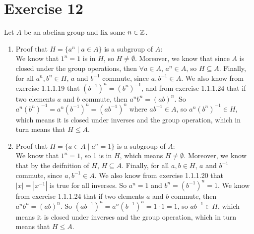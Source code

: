 \documentclass[12pt]{article}
\begin{document}
    \section*{Exercise 12}
    Let $A$ be an abelian group and fix some $n \in \mathbb{Z}$. \\
    \begin{enumerate}[label=\textbf{\alph*.}]
        \item 
            Proof that $H = \{a^n \mid a \in A\}$ is a subgroup of $A$: \\
            We know that $1^n = 1$ is in $H$, so $H \neq \emptyset$.
            Moreover, we know that since $A$ is closed under
            the group operations,
            then $\forall a \in A$, $a^n \in A$,
            so $H \subseteq A$.
            Finally, for all $a^n, b^n \in H$, $a$ and $b^{-1}$ commute,
            since $a, b^{-1} \in A$.
            We also know from exercise 1.1.1.19
            that $(b^{-1})^n = (b^n)^{-1}$,
            and from exercise 1.1.1.24 that if two elements $a$ and $b$
            commute, then $a^nb^n = (ab)^n$.
            So $a^n(b^n)^{-1} = a^n(b^{-1})^n = (ab^{-1})^n$
            where $ab^{-1} \in A$,
            so $a^n(b^n)^{-1} \in H$,
            which means it is closed under inverses and the group operation,
            which in turn means that $H \leqslant A$.
        \item
            Proof that $H = \{a \in A \mid a^n = 1\}$ is a subgroup of $A$: \\
            We know that $1^n = 1$, so 1 is in $H$,
            which means $H \neq \emptyset$.
            Moreover, we know that by the deifnition of $H$,
            $H \subseteq A$.
            Finally, for all $a, b \in H$, $a$ and $b^{-1}$ commute,
            since $a, b^{-1} \in A$.
            We also know from exercise 1.1.1.20 that $|x| = |x^{-1}|$
            is true for all inverses.
            So $a^n = 1$ and $b^n = (b^{-1})^n = 1$.
            We know from exercise 1.1.1.24 that if two elements $a$ and $b$
            commute, then $a^nb^n = (ab)^n$.
            So $(ab^{-1})^n = a^n(b^{-1})^n = 1 \cdot 1 = 1$,
            so $ab^{-1} \in H$,
            which means it is closed under inverses and the group operation,
            which in turn means that $H \leqslant A$.
    \end{enumerate}
\end{document}
